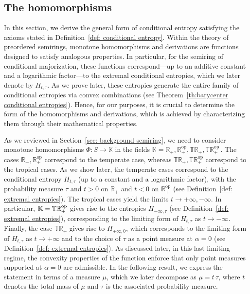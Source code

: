 \documentclass[aps,pra,11pt,onecolumn,nofootinbib,tightenlines]{revtex4-2}
\theoremstyle{definition}
\begin{document}
\subsection{The homomorphisms}
\label{sec: all monotone homomorphisms}
In this section, we derive the general form of conditional entropy satisfying the axioms stated in Definition~\ref{def: conditional entropy}. Within the theory of preordered semirings, monotone homomorphisms and derivations are functions designed to satisfy analogous properties. In particular, for the semiring of conditional majorization, these functions correspond—up to an additive constant and a logarithmic factor—to the extremal conditional entropies, which we later denote by $H_{t,\tau}$. As we prove later, these entropies generate the entire family of conditional entropies via convex combinations (see Theorem~\ref{th:barycenter conditional entropies}). Hence, for our purposes, it is crucial to determine the form of the homomorphisms and derivations, which is achieved by characterizing them through their mathematical properties.



As we reviewed in Section~\ref{sec: background semiring}, we need to consider monotone homomorphisms \(\Phi: S \to \mathbb{K}\) in the fields $
    \mathbb{K} = \mathbb{R}_+,\mathbb{R}_+^{\mathrm{op}},\mathbb{TR}_+,\mathbb{TR}_+^{\mathrm{op}} \,.$
The cases $\mathbb{R}_+,\mathbb{R}_+^{\mathrm{op}}$ correspond to the temperate case, whereas $\mathbb{TR}_+,\mathbb{TR}_+^{\mathrm{op}} $ correspond to the tropical cases.
As we show later, the temperate cases correspond to the conditional entropy $H_{t,\tau}$ (up to a constant and a logarithmic factor), with the probability measure $\tau$ and $t>0$ on $\mathbb{R}_+$ and $t<0$ on $\mathbb{R}_+^{\mathrm{op}}$ (see Definition~\ref{def: extremal entropies}). The tropical cases yield the limits $t\to+\infty,-\infty$. In particular, $\mathbb{K} = \mathbb{TR}_+^{\rm op}$ gives rise to the entropies $H_{-\infty,\tau}$ (see Definition~\ref{def: extremal entropies}), corresponding to the limiting form of $H_{t,\tau}$ as $t\to-\infty$.
Finally, the case \(\mathbb{TR}_+\) gives rise to \(H_{+\infty,0}\), which corresponds to the limiting form of \(H_{t,\tau}\) as \(t \to +\infty\) and to the choice of \(\tau\) as a point measure at \(\alpha = 0\) (see Definition~\ref{def: extremal entropies}). As discussed later, in this last limiting regime, the convexity properties of the function enforce that only point measures supported at \(\alpha = 0\) are admissible. In the following result, we express the statement in terms of a measure \(\mu\), which we later decompose as \(\mu = t\,\tau\), where \(t\) denotes the total mass of \(\mu\) and \(\tau\) is the associated probability measure.
\end{document}
